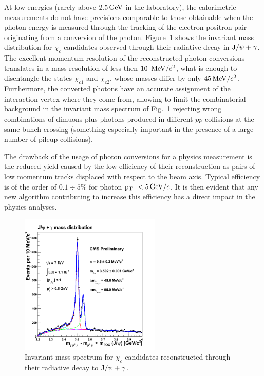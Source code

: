 \documentclass[a4paper]{jpconf}
\def \Chione {\chi_{c1}}
\def \Chitwo {\chi_{c2}}
\def \JPsi{\rm J/\psi}
\def \cPgg{\gamma}
\def \pt{$\p_{\rm T}$~}
\begin{document}
At  low energies (rarely above 
$2.5{\rm \, GeV}$ in the laboratory), the calorimetric
measurements do not have precisions comparable to those obtainable
when the photon energy is measured through the tracking of the 
electron-positron pair originating from a conversion of the photon.
Figure~\ref{fig:chic} shows the invariant mass distribution for $\chi_c$ candidates
observed through their radiative decay in $\JPsi + \cPgg$. The excellent momentum resolution of the reconstructed photon conversions translates in a mass resolution of less then $10~{\rm \, MeV}/c^2$, what is enough to disentangle  the states $\Chione$ and $\Chitwo$, whose masses differ by only $45{\rm \, MeV}/c^2$.
%
Furthermore, the  converted photons have an accurate assignment of the interaction vertex where they come from, allowing  to limit the combinatorial background in the invariant mass spectrum of Fig.~\ref{fig:chic}
rejecting wrong combinations of  dimuons  plus  photons produced in different $pp$ collisions at the same bunch crossing (something especially important in the
presence of a large number of pileup collisions). 


The drawback of the usage of photon conversions for a physics measurement 
is the reduced yield caused by the low efficiency of their reconstruction as pairs of low momentum tracks displaced with respect to the beam axis. Typical efficiency is of the order of $0.1 \div 5\%$ for photon \pt  $< 5 {\rm \, GeV}/c$. It is then evident that any new algorithm contributing to increase this efficiency has a direct impact in the physics analyses.





\begin{figure}[h]
  \begin{center}
    \includegraphics[width=0.6\textwidth]{fig/Chic1fb.png}
   \caption{    \label{fig:chic}
Invariant mass spectrum for $\chi_c$ candidates  reconstructed through their radiative decay to $\JPsi + \cPgg$.}
     \end{center}
\end{figure} 
\end{document}
